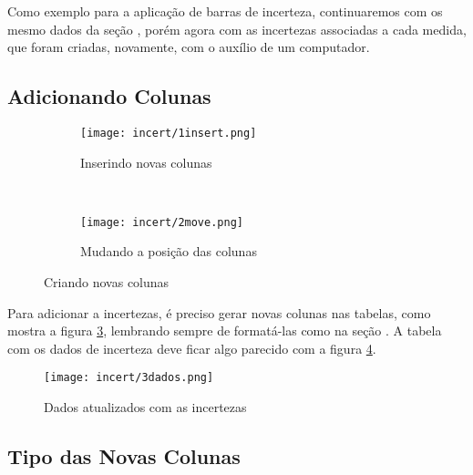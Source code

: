 Como exemplo para a aplicação de barras de incerteza, continuaremos com os mesmo dados da seção , porém agora com as incertezas associadas a cada medida, que foram criadas, novamente, com o auxílio de um computador.


\subsection{Adicionando Colunas}

    \begin{figure}[htbp]
        \centering
        \begin{subfigure}{0.27\textwidth}
            \centering
            \texttt{[image: incert/1insert.png]}

            \caption{Inserindo novas colunas}
            \label{fig:incert:insert}
        \end{subfigure}
        ~
        \begin{subfigure}{0.35\textwidth}
            \centering
            \texttt{[image: incert/2move.png]}

            \caption{Mudando a posição das colunas}
            \label{fig:incert:mover}
        \end{subfigure}
        \caption{Criando novas colunas}
        \label{fig:incert:colunas}
    \end{figure}

    Para adicionar a incertezas, é preciso gerar novas colunas nas tabelas, como mostra a figura \ref{fig:incert:colunas}, lembrando sempre de formatá-las como na seção . A tabela com os dados de incerteza deve ficar algo parecido com a figura \ref{fig:incert:dados}.

    \begin{figure}[htbp]
        \centering
        \texttt{[image: incert/3dados.png]}

        \caption{Dados atualizados com as incertezas}
        \label{fig:incert:dados}
    \end{figure}


\subsection{Tipo das Novas Colunas}

